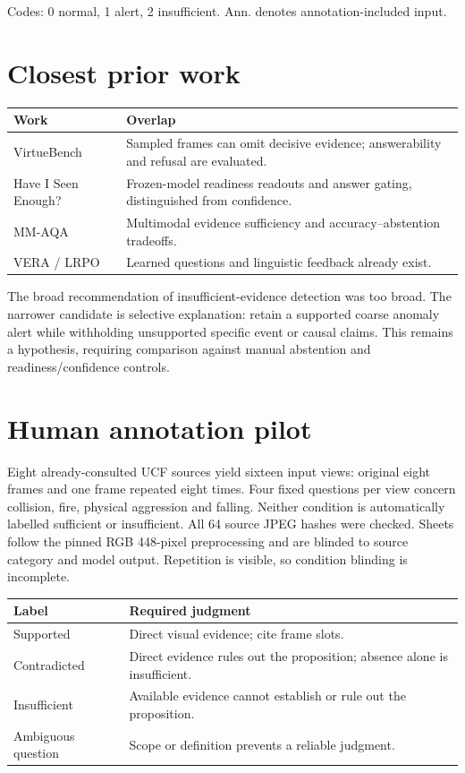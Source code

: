 \documentclass[11pt]{article}
\begin{document}
\begin{center}\small\end{center}
Codes: 0 normal, 1 alert, 2 insufficient. Ann. denotes annotation-included input.

\section{Closest prior work}
\begin{tabularx}{\linewidth}{lX}\toprule Work&Overlap\\\midrule
VirtueBench&Sampled frames can omit decisive evidence; answerability and refusal are evaluated.\\
Have I Seen Enough?&Frozen-model readiness readouts and answer gating, distinguished from confidence.\\
MM-AQA&Multimodal evidence sufficiency and accuracy--abstention tradeoffs.\\
VERA / LRPO&Learned questions and linguistic feedback already exist.\\\bottomrule\end{tabularx}
The broad recommendation of insufficient-evidence detection was too broad. The narrower candidate is selective explanation: retain a supported coarse anomaly alert while withholding unsupported specific event or causal claims. This remains a hypothesis, requiring comparison against manual abstention and readiness/confidence controls.
\section{Human annotation pilot}
Eight already-consulted UCF sources yield sixteen input views: original eight frames and one frame repeated eight times. Four fixed questions per view concern collision, fire, physical aggression and falling. Neither condition is automatically labelled sufficient or insufficient. All 64 source JPEG hashes were checked. Sheets follow the pinned RGB 448-pixel preprocessing and are blinded to source category and model output. Repetition is visible, so condition blinding is incomplete.

\begin{tabularx}{\linewidth}{lX}\toprule Label&Required judgment\\\midrule
Supported&Direct visual evidence; cite frame slots.\\
Contradicted&Direct evidence rules out the proposition; absence alone is insufficient.\\
Insufficient&Available evidence cannot establish or rule out the proposition.\\
Ambiguous question&Scope or definition prevents a reliable judgment.\\\bottomrule\end{tabularx}
\end{document}
